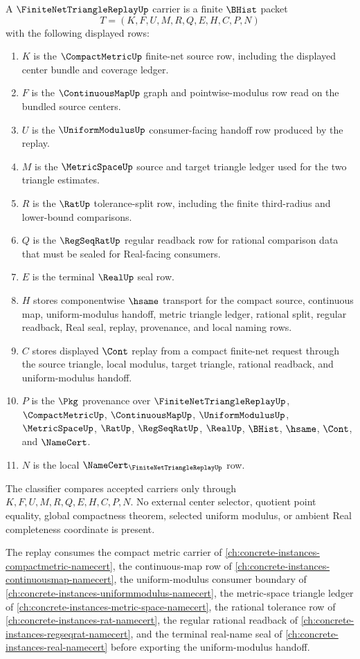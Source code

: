 \begin{definition}
\label{def:finite-net-triangle-replay-carrier}
A $\FiniteNetTriangleReplayUp$ carrier is a finite $\BHist$ packet
$$
T=(K,F,U,M,R,Q,E,H,C,P,N)
$$
with the following displayed rows:
\begin{enumerate}
\item $K$ is the $\CompactMetricUp$ finite-net source row, including the displayed center bundle and coverage ledger.
\item $F$ is the $\ContinuousMapUp$ graph and pointwise-modulus row read on the bundled source centers.
\item $U$ is the $\UniformModulusUp$ consumer-facing handoff row produced by the replay.
\item $M$ is the $\MetricSpaceUp$ source and target triangle ledger used for the two triangle estimates.
\item $R$ is the $\RatUp$ tolerance-split row, including the finite third-radius and lower-bound comparisons.
\item $Q$ is the $\RegSeqRatUp$ regular readback row for rational comparison data that must be sealed for Real-facing consumers.
\item $E$ is the terminal $\RealUp$ seal row.
\item $H$ stores componentwise $\hsame$ transport for the compact source, continuous map, uniform-modulus handoff, metric triangle ledger, rational split, regular readback, Real seal, replay, provenance, and local naming rows.
\item $C$ stores displayed $\Cont$ replay from a compact finite-net request through the source triangle, local modulus, target triangle, rational readback, and uniform-modulus handoff.
\item $P$ is the $\Pkg$ provenance over $\FiniteNetTriangleReplayUp$, $\CompactMetricUp$, $\ContinuousMapUp$, $\UniformModulusUp$, $\MetricSpaceUp$, $\RatUp$, $\RegSeqRatUp$, $\RealUp$, $\BHist$, $\hsame$, $\Cont$, and $\NameCert$.
\item $N$ is the local $\NameCert_{\FiniteNetTriangleReplayUp}$ row.
\end{enumerate}
The classifier compares accepted carriers only through $K,F,U,M,R,Q,E,H,C,P,N$. No external center selector, quotient point equality, global compactness theorem, selected uniform modulus, or ambient Real completeness coordinate is present.

The replay consumes the compact metric carrier of \autoref{ch:concrete-instances-compactmetric-namecert}, the continuous-map row of \autoref{ch:concrete-instances-continuousmap-namecert}, the uniform-modulus consumer boundary of \autoref{ch:concrete-instances-uniformmodulus-namecert}, the metric-space triangle ledger of \autoref{ch:concrete-instances-metric-space-namecert}, the rational tolerance row of \autoref{ch:concrete-instances-rat-namecert}, the regular rational readback of \autoref{ch:concrete-instances-regseqrat-namecert}, and the terminal real-name seal of \autoref{ch:concrete-instances-real-namecert} before exporting the uniform-modulus handoff.
\end{definition}

